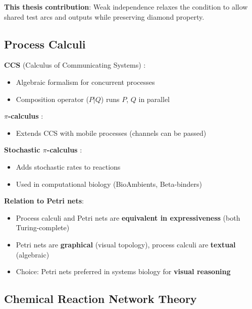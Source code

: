 \textbf{This thesis contribution}: Weak independence relaxes the condition to allow shared test arcs and outputs while preserving diamond property.

\subsection{Process Calculi}
\label{subsec:process-calculi}

\textbf{CCS} (Calculus of Communicating Systems) \citep{Milner1980}:

\begin{itemize}
    \item Algebraic formalism for concurrent processes
    \item Composition operator ($P | Q$) runs $P$, $Q$ in parallel
\end{itemize}

\textbf{$\pi$-calculus} \citep{Milner1992}:

\begin{itemize}
    \item Extends CCS with mobile processes (channels can be passed)
\end{itemize}

\textbf{Stochastic $\pi$-calculus} \citep{Priami1995}:

\begin{itemize}
    \item Adds stochastic rates to reactions
    \item Used in computational biology (BioAmbients, Beta-binders)
\end{itemize}

\textbf{Relation to Petri nets}:

\begin{itemize}
    \item Process calculi and Petri nets are \textbf{equivalent in expressiveness} (both Turing-complete)
    \item Petri nets are \textbf{graphical} (visual topology), process calculi are \textbf{textual} (algebraic)
    \item Choice: Petri nets preferred in systems biology for \textbf{visual reasoning}
\end{itemize}

\subsection{Chemical Reaction Network Theory}
\label{subsec:crn-theory}

